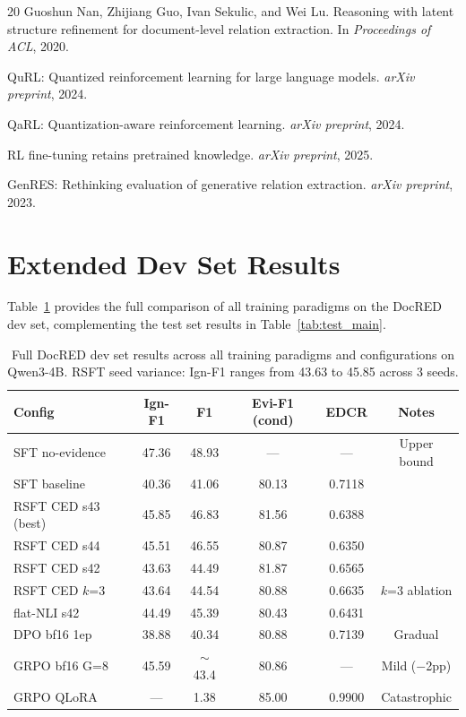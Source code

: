 \documentclass[11pt,a4paper]{article}
\newcommand{\ced}{CED}
\begin{document}
\begin{thebibliography}{20}
Guoshun Nan, Zhijiang Guo, Ivan Sekulic, and Wei Lu.
\newblock Reasoning with latent structure refinement for document-level relation extraction.
\newblock In \emph{Proceedings of ACL}, 2020.

QuRL: Quantized reinforcement learning for large language models.
\newblock \emph{arXiv preprint}, 2024.

QaRL: Quantization-aware reinforcement learning.
\newblock \emph{arXiv preprint}, 2024.

RL fine-tuning retains pretrained knowledge.
\newblock \emph{arXiv preprint}, 2025.

GenRES: Rethinking evaluation of generative relation extraction.
\newblock \emph{arXiv preprint}, 2023.

\end{thebibliography}

\appendix

\section{Extended Dev Set Results}
\label{app:dev_results}

Table~\ref{tab:dev_full} provides the full comparison of all training paradigms on the DocRED dev set, complementing the test set results in Table~\ref{tab:test_main}.

\begin{table}[t]
\centering
\small
\begin{tabular}{lccccc}
\toprule
\textbf{Config} & \textbf{Ign-F1} & \textbf{F1} & \textbf{Evi-F1 (cond)} & \textbf{EDCR} & \textbf{Notes} \\
\midrule
SFT no-evidence & 47.36 & 48.93 & --- & --- & Upper bound \\
SFT baseline & 40.36 & 41.06 & 80.13 & 0.7118 & \\
RSFT \ced{} s43 (best) & 45.85 & 46.83 & 81.56 & 0.6388 & \\
RSFT \ced{} s44 & 45.51 & 46.55 & 80.87 & 0.6350 & \\
RSFT \ced{} s42 & 43.63 & 44.49 & 81.87 & 0.6565 & \\
RSFT \ced{} $k$=3 & 43.64 & 44.54 & 80.88 & 0.6635 & $k$=3 ablation \\
flat-NLI s42 & 44.49 & 45.39 & 80.43 & 0.6431 & \\
DPO bf16 1ep & 38.88 & 40.34 & 80.88 & 0.7139 & Gradual \\
GRPO bf16 G=8 & 45.59 & $\sim$43.4 & 80.86 & --- & Mild ($-$2pp) \\
GRPO QLoRA & --- & 1.38 & 85.00 & 0.9900 & Catastrophic \\
\bottomrule
\end{tabular}
\caption{Full DocRED dev set results across all training paradigms and configurations on Qwen3-4B. RSFT seed variance: Ign-F1 ranges from 43.63 to 45.85 across 3 seeds.}
\label{tab:dev_full}
\end{table}
\end{document}
